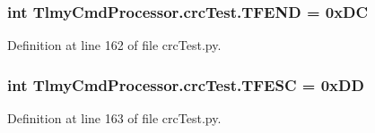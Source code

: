 \subsubsection[{T\+F\+E\+N\+D}]{\setlength{\rightskip}{0pt plus 5cm}int Tlmy\+Cmd\+Processor.\+crc\+Test.\+T\+F\+E\+N\+D = 0x\+D\+C}\label{namespace_tlmy_cmd_processor_1_1crc_test_a0c53a9252c9f79e6e39eb47f43f9b79a}


Definition at line 162 of file crc\+Test.\+py.

\hypertarget{namespace_tlmy_cmd_processor_1_1crc_test_a60b1bb9a6efaef0a1421d38c2c05febd}{}
\subsubsection[{T\+F\+E\+S\+C}]{\setlength{\rightskip}{0pt plus 5cm}int Tlmy\+Cmd\+Processor.\+crc\+Test.\+T\+F\+E\+S\+C = 0x\+D\+D}\label{namespace_tlmy_cmd_processor_1_1crc_test_a60b1bb9a6efaef0a1421d38c2c05febd}


Definition at line 163 of file crc\+Test.\+py.

